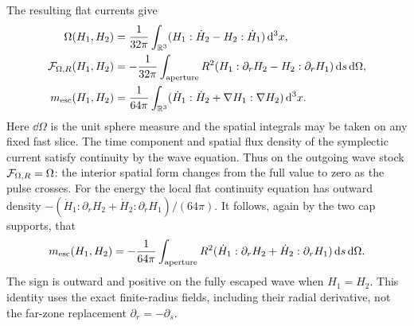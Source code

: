 The resulting flat currents give
\begin{align}
 \Omega(H_1,H_2)
   &= \frac1{32\pi}\int_{\mathbb R^3}
        (H_1:\dot H_2-H_2:\dot H_1)\,\mathrm d^3x, \label{eq:Omega}\\
 \mathcal F_{\Omega,R}(H_1,H_2)
   &= -\frac1{32\pi}\int_{\rm aperture}R^2
        (H_1:\partial_r H_2-H_2:\partial_r H_1)\,\mathrm d s\,\mathrm d\Omega, \label{eq:symout}\\
 m_{\mathrm{esc}}(H_1,H_2)
   &=\frac1{64\pi}\int_{\mathbb R^3}
      (\dot H_1:\dot H_2+\nabla H_1:\nabla H_2)\,\mathrm d^3x .
       \label{eq:masswave}
\end{align}
Here \(\dd\Omega\) is the unit sphere measure and the spatial integrals may be taken on any fixed fast slice. The time component and spatial flux density of the symplectic current satisfy continuity by the wave equation. Thus on the outgoing wave stock \(\mathcal F_{\Omega,R}=\Omega\): the interior spatial form changes from the full value to zero as the pulse crosses. For the energy the local flat continuity equation has outward density
\(-(\dot H_1:\partial_rH_2+\dot H_2:\partial_rH_1)/(64\pi)\).
It follows, again by the two cap supports, that
\begin{equation}
 m_{\mathrm{esc}}(H_1,H_2)
  =-\frac1{64\pi}\int_{\rm aperture} R^2
       (\dot H_1:\partial_r H_2+\dot H_2:\partial_r H_1)
                      \,\mathrm d s\,\mathrm d\Omega .
 \label{eq:energyout}
\end{equation}
The sign is outward and positive on the fully escaped wave when \(H_1=H_2\). This identity uses the exact finite-radius fields, including their radial derivative, not the far-zone replacement \(\partial_r=-\partial_s\).

